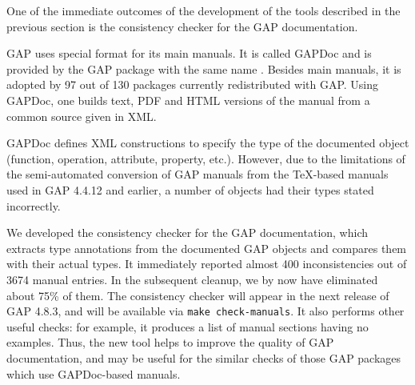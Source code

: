 One of the immediate outcomes of the development of the tools described in the
previous section is the consistency checker for the GAP documentation. 

GAP uses special format for its main manuals. It is called GAPDoc and is 
provided by the GAP package with the same name \cite{gapdoc}. Besides main 
manuals, it is adopted by 97 out of 130 packages currently redistributed 
with GAP. Using GAPDoc, one builds text, PDF and HTML versions of the manual
from a common source given in XML.

GAPDoc defines XML constructions to specify the type of the documented object 
(function, operation, attribute, property, etc.). However, due to the 
limitations of the semi-automated conversion of GAP manuals from the \TeX-based
manuals used in GAP 4.4.12 and earlier, a number of objects had their types
stated incorrectly. 

We developed the consistency checker for the GAP documentation, which extracts
type annotations from the documented GAP objects and compares them with their
actual types. It immediately reported almost 400 inconsistencies out of 3674 
manual entries. In the subsequent cleanup, we by now have eliminated about 
75\% of them. The  consistency checker will appear in the next release of
GAP 4.8.3, and will be available via \texttt{make check-manuals}.
It also performs other useful checks: for example, it produces a list of
manual sections having no examples. Thus, the new tool helps to improve
the quality of GAP documentation, and may be useful for the similar checks
of those GAP packages which use GAPDoc-based manuals.




